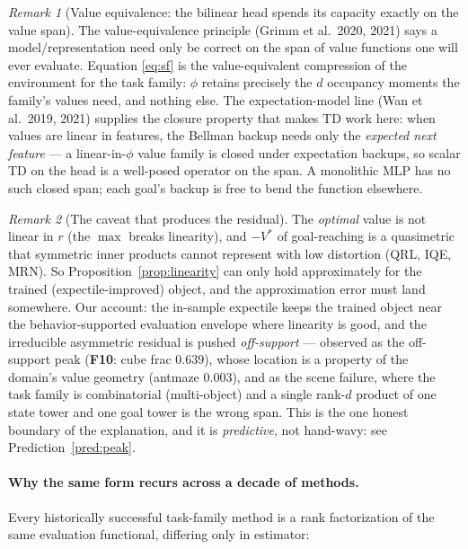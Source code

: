 \documentclass[11pt]{article}
\theoremstyle{definition}
\theoremstyle{remark}
\newtheorem{remark}{Remark}
\begin{document}
\begin{remark}[Value equivalence: the bilinear head spends its capacity exactly on the value
span]\label{rem:ve}
The value-equivalence principle (Grimm et al.\ 2020, 2021) says a model/representation need
only be correct on the span of value functions one will ever evaluate. Equation
\eqref{eq:sf} is the value-equivalent compression of the environment for the task family:
$\phi$ retains precisely the $d$ occupancy moments the family's values need, and nothing
else. The expectation-model line (Wan et al.\ 2019, 2021) supplies the closure property that
makes TD work here: when values are linear in features, the Bellman backup needs only the
\emph{expected next feature} --- a linear-in-$\phi$ value family is closed under expectation
backups, so scalar TD on the head is a well-posed operator on the span. A monolithic MLP has
no such closed span; each goal's backup is free to bend the function elsewhere.
\end{remark}

\begin{remark}[The caveat that produces the residual]\label{rem:quasimetric}
The \emph{optimal} value is not linear in $r$ (the $\max$ breaks linearity), and
$-V^*$ of goal-reaching is a quasimetric that symmetric inner products cannot represent with
low distortion (QRL, IQE, MRN). So Proposition~\ref{prop:linearity} can only hold
approximately for the trained (expectile-improved) object, and the approximation error must
land somewhere. Our account: the in-sample expectile keeps the trained object near the
behavior-supported evaluation envelope where linearity is good, and the irreducible
asymmetric residual is pushed \emph{off-support} --- observed as the off-support peak
(\textbf{F10}: cube frac $0.639$), whose location is a property of the domain's value
geometry (antmaze $0.003$), and as the scene failure, where the task family is
combinatorial (multi-object) and a single rank-$d$ product of one state tower and one goal
tower is the wrong span. This is the one honest boundary of the explanation, and it is
\emph{predictive}, not hand-wavy: see Prediction~\ref{pred:peak}.
\end{remark}

\paragraph{Why the same form recurs across a decade of methods.} Every historically
successful task-family method is a rank factorization of the same evaluation functional,
differing only in estimator:
\end{document}
